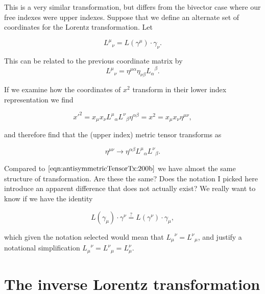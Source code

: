 This is a very similar transformation, but differs from the bivector case where our free indexes were upper indexes.  Suppose that we define an alternate set of coordinates for the Lorentz transformation.  Let

\begin{equation}\label{eqn:antisymmetricTensorTx:380}
{L^\mu}_\nu = L(\gamma^\mu) \cdot \gamma_\nu.
\end{equation}

This can be related to the previous coordinate matrix by
\begin{equation}\label{eqn:antisymmetricTensorTx:390}
{L^\mu}_\nu = \eta^{\mu \alpha } \eta_{\nu \beta } {L_\alpha}^\beta. 
\end{equation}

If we examine how the coordinates of $x^2$ transform in their lower index representation we find

\begin{equation}\label{eqn:antisymmetricTensorTx:400}
{x'}^2 = x_\mu x_\nu {L^\mu}_\alpha {L^\nu}_\beta \eta^{\alpha \beta} = x^2 = x_\mu x_\nu \eta^{\mu \nu},
\end{equation}

and therefore find that the (upper index) metric tensor transforms as

\begin{equation}\label{eqn:antisymmetricTensorTx:410}
\eta^{\mu \nu} \rightarrow
\eta^{\alpha \beta}
{L^\mu}_\alpha {L^\nu}_\beta .
\end{equation}

Compared to $\ref{eqn:antisymmetricTensorTx:200b}$ we have almost the same structure of transformation.  Are these the same?  Does the notation I picked here introduce an apparent difference that does not actually exist?  We really want to know if we have the identity

\begin{equation}\label{eqn:antisymmetricTensorTx:420}
L(\gamma_\mu) \cdot \gamma^\nu
\stackrel{?}{=}
L(\gamma^\nu) \cdot \gamma_\mu,
\end{equation}

which given the notation selected would mean that ${L_\mu}^\nu = {L^\nu}_\mu$, and justify a notational simplification ${L_\mu}^\nu = {L^\nu}_\mu = L^\nu_\mu$.

\section{The inverse Lorentz transformation}

